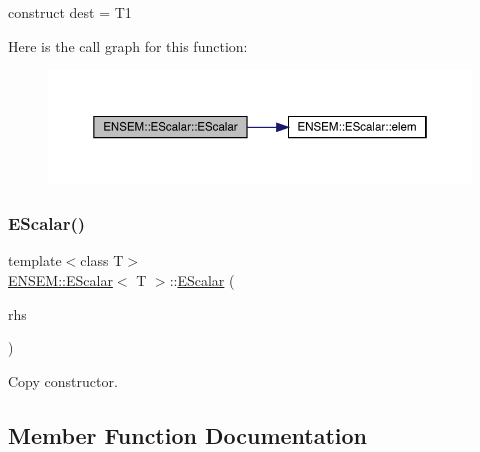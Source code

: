 construct dest = T1 

Here is the call graph for this function\+:
\nopagebreak
\begin{figure}[H]
\begin{center}
\leavevmode
\includegraphics[width=350pt]{d0/d82/classENSEM_1_1EScalar_a1436a0e5b8bf00083caf1540f4fc9397_cgraph}
\end{center}
\end{figure}
\mbox{\label{classENSEM_1_1EScalar_a002ac4bc9bc6e5ad476613e4edaa827a}} 
\subsubsection{\texorpdfstring{EScalar()}{EScalar()}\hspace{0.1cm}{\footnotesize\ttfamily [12/12]}}
{\footnotesize\ttfamily template$<$class T$>$ \\
\mbox{\hyperlink{classENSEM_1_1EScalar}{E\+N\+S\+E\+M\+::\+E\+Scalar}}$<$ T $>$\+::\mbox{\hyperlink{classENSEM_1_1EScalar}{E\+Scalar}} (\begin{DoxyParamCaption}\item[{const \mbox{\hyperlink{classENSEM_1_1EScalar}{E\+Scalar}}$<$ T $>$ \&}]{rhs }\end{DoxyParamCaption})\hspace{0.3cm}{\ttfamily [inline]}}



Copy constructor. 



\subsection{Member Function Documentation}
\mbox{\label{classENSEM_1_1EScalar_a9b88ad4d69d05f69b6483701487ddb74}} 
